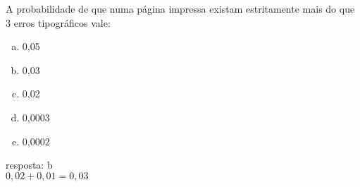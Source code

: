 \begin{ex}
A probabilidade de que numa página impressa existam estritamente mais do que 3 erros tipográficos vale:
   \begin{enumerate}[(a)]
   \item 0,05
   \item 0,03
   \item 0,02
   \item 0,0003
   \item 0,0002
   \end{enumerate}
     \begin{sol}
      resposta: b \\
      $0,02 + 0,01 = 0,03$
     \end{sol}
\end{ex}